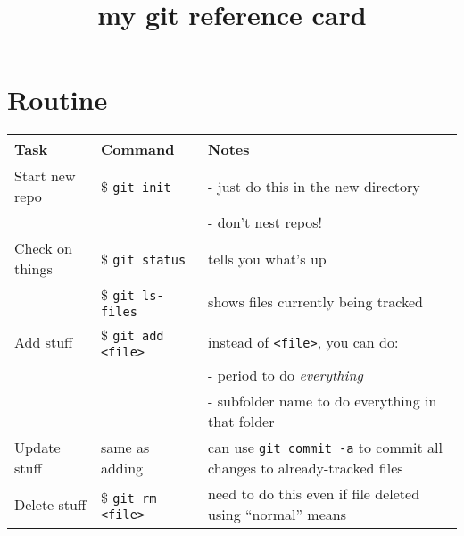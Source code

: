 \documentclass[]{article}
\title{my git reference card}
\author{}
\date{}
\begin{document}
\maketitle

\thispagestyle{empty}
\pagestyle{empty}

\section*{Routine}
\label{sec-1}


\begin{center}
\begin{tabular}{llp{2.5in}}
 Task                 &  Command                                            &  Notes                                                                          \\
\hline
 Start new repo       &  \$ \texttt{git init}                               &  - just do this in the new directory                                            \\
                      &                                                     &  - don't nest repos!                                                            \\
 Check on things      &  \$ \texttt{git status}                             &  tells you what's up                                                            \\
                      &  \$ \texttt{git ls-files}                           &  shows files currently being tracked                                            \\
 Add stuff            &  \$ \texttt{git add <file>}                         &  instead of \texttt{<file>}, you can do:                                        \\
                      &                                                     &  - period to do \emph{everything}                                               \\
                      &                                                     &  - subfolder name to do everything in that folder                               \\
 Update stuff         &  same as adding                                     &  can use \texttt{git commit -a} to commit all changes to already-tracked files  \\
 Delete stuff         &  \$ \texttt{git rm <file>}                          &  need to do this even if file deleted using ``normal'' means                    \\

\end{tabular}
\end{center}
\end{document}
